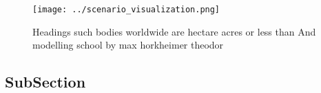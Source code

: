 \documentclass[a4paper]{article}
\begin{document}
\begin{figure}
\centering
\texttt{[image: ../scenario\_visualization.png]}
\caption{Headings such bodies worldwide are hectare acres or less than And modelling school by max horkheimer theodor 
}
\end{figure}
 
\subsection{SubSection}
\end{document}
